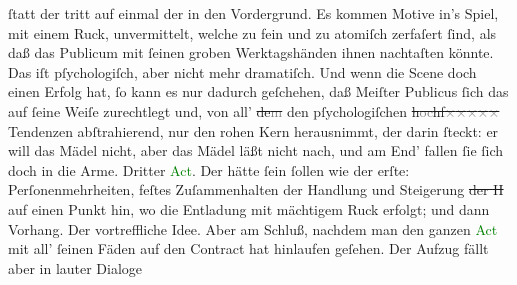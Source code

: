 \documentclass[twoside=false,titlepage=false,open=any, parskip=never, fontsize=12pt, headings=small, chapterprefix=false, appendixprefix=false]{scrbook}
\newcommand{\strikeout}[1]{\sout{#1}}
\newcommand{\pbposition}{\depth}
\newcommand{\pb}{\nobreak\hspace{0pt}\raisebox{-0.1em}{\raisebox{\pbposition}{\textnormal{|}}}\nobreak\hspace{0pt}}
\begin{document}
               ſtatt der \label{K_L02674-11v}\label{K_L02674-11h} tritt auf einmal der \label{K_L02674-66v}\label{K_L02674-66h} in den {\pb}Vordergrund. Es kommen Motive in’s Spiel, mit einem
               Ruck, unvermittelt, welche zu fein und zu atomiſch zerfaſert ſind, als daß das
               Publicum mit ſeinen groben Werktagshänden ihnen nachtaſten könnte. Das iſt
               pſychologiſch, aber nicht mehr dramatiſch. Und wenn die Scene doch einen Erfolg hat,
               ſo kann es nur dadurch geſchehen, daß Meiſter Publicus ſich das auf ſeine Weiſe
               zurechtlegt und, von all’ \strikeout{de\textcolor{gray}{m}} den pſychologiſchen \strikeout{h\textcolor{gray}{oc}hf\textcolor{gray}{×}\-\textcolor{gray}{×}\-\textcolor{gray}{×}\-\textcolor{gray}{×}\-\textcolor{gray}{×}} Tendenzen abſtrahierend, nur den rohen Kern herausnimmt, der darin ſteckt: er
               will das Mädel nicht, aber das Mädel läßt nicht nach, und am End’ fallen ſie ſich
               doch in die Arme. Dritter \textcolor{green}{Act}{}.
               Der hätte ſein ſollen wie der erſte: Perſonenmehrheiten, feſtes Zuſammenhalten der
               Handlung und Steigerung \strikeout{der H} auf einen Punkt hin, wo
               die Entladung mit mächtigem Ruck erfolgt; und dann Vorhang. Der \label{K_L02674-88v}\label{K_L02674-88h}{ }{\pb}vortreffliche Idee. Aber am Schluß, nachdem man den
               ganzen \textcolor{green}{Act}{} mit all’ ſeinen
               Fäden auf den Contract hat hinlaufen geſehen. Der Aufzug fällt aber in lauter Dialoge
\end{document}
